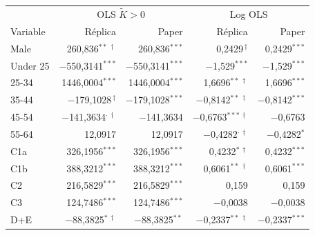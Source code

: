 \begin{tabular}{lrrrr}\toprule
 & \multicolumn{2}{c}{OLS $\tilde K>0$} & \multicolumn{2}{c}{Log OLS} \\
Variable & Réplica & Paper & Réplica & Paper \\\midrule
Male & 260,836$^{**\,\dagger}$ & 260,836$^{***}$ & 0,2429$^{\,\dagger}$ & 0,2429$^{***}$ \\
Under 25 & $-$550,3141$^{***}$ & $-$550,3141$^{***}$ & $-$1,529$^{***}$ & $-$1,529$^{***}$ \\
25-34 & 1446,0004$^{***}$ & 1446,0004$^{***}$ & 1,6696$^{**\,\dagger}$ & 1,6696$^{***}$ \\
35-44 & $-$179,1028$^{\,\dagger}$ & $-$179,1028$^{***}$ & $-$0,8142$^{**\,\dagger}$ & $-$0,8142$^{***}$ \\
45-54 & $-$141,3634$^{\cdot\,\dagger}$ & $-$141,3634 & $-$0,6763$^{***\,\dagger}$ & $-$0,6763 \\
55-64 & 12,0917 & 12,0917 & $-$0,4282$^{\cdot\,\dagger}$ & $-$0,4282$^{*}$ \\
C1a & 326,1956$^{***}$ & 326,1956$^{***}$ & 0,4232$^{*\,\dagger}$ & 0,4232$^{***}$ \\
C1b & 388,3212$^{***}$ & 388,3212$^{***}$ & 0,6061$^{**\,\dagger}$ & 0,6061$^{***}$ \\
C2 & 216,5829$^{***}$ & 216,5829$^{***}$ & 0,159 & 0,159 \\
C3 & 124,7486$^{***}$ & 124,7486$^{***}$ & $-$0,0038 & $-$0,0038 \\
D+E & $-$88,3825$^{*\,\dagger}$ & $-$88,3825$^{**}$ & $-$0,2337$^{**\,\dagger}$ & $-$0,2337$^{***}$ \\
\bottomrule\end{tabular}
